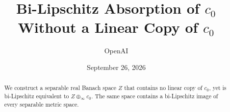 \documentclass[11pt]{article}
\title{Bi-Lipschitz Absorption of \(c_0\)\\
Without a Linear Copy of \(c_0\)}
\author{OpenAI}
\date{September 26, 2026}
\numberwithin{equation}{section}
\theoremstyle{definition}
\theoremstyle{remark}
\begin{document}
\maketitle
\begin{abstract}
We construct a separable real Banach space \(Z\) that contains no linear
copy of \(c_0\), yet is bi-Lipschitz equivalent to
\(Z\oplus_\infty c_0\). The same space contains a bi-Lipschitz image
of every separable metric space.
\end{abstract}










\end{document}
